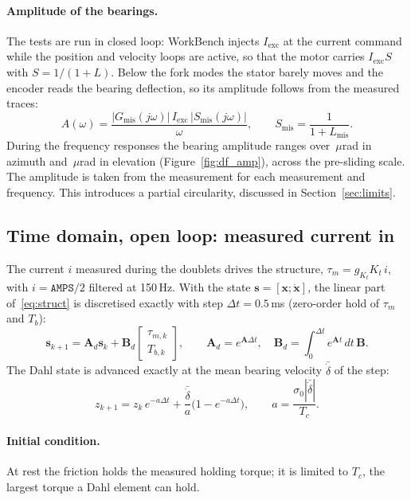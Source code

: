 \documentclass[10pt,a4paper]{article}
\numberwithin{equation}{section}
\begin{document}
\paragraph{Amplitude of the bearings.} The tests are run in closed loop: WorkBench injects $I_\mathrm{exc}$ at the current command while the position and velocity loops are active, so that the motor carries $I_\mathrm{exc}S$ with $S=1/(1+L)$. Below the fork modes the stator barely moves and the encoder reads the bearing deflection, so its amplitude follows from the measured traces:
\begin{equation}
A(\omega)=\frac{|G_\mathrm{mis}(j\omega)|\,I_\mathrm{exc}\,|S_\mathrm{mis}(j\omega)|}{\omega},\qquad S_\mathrm{mis}=\frac{1}{1+L_\mathrm{mis}} .\label{eq:amp}
\end{equation}
During the frequency responses the bearing amplitude ranges over \ArangeA\,$\mu$rad in azimuth and \ArangeP\,$\mu$rad in elevation (Figure~\ref{fig:df_amp}), across the pre-sliding scale. The amplitude is taken from the measurement for each measurement and frequency. This introduces a partial circularity, discussed in Section~\ref{sec:limits}.

\subsection{Time domain, open loop: measured current in}\label{sec:ol}
The current $i$ measured during the doublets drives the structure, $\tau_m=g_{K_t}K_t\,i$, with $i=\texttt{AMPS}/2$ filtered at 150\,Hz. With the state $\mathbf s=[\mathbf x;\dot{\mathbf x}]$, the linear part of~\eqref{eq:struct} is discretised exactly with step $\Delta t=0.5$\,ms (zero-order hold of $\tau_m$ and $T_b$):
\begin{equation}
\mathbf s_{k+1}=\mathbf A_d\mathbf s_k+\mathbf B_d\begin{bmatrix}\tau_{m,k}\\ T_{b,k}\end{bmatrix},\qquad \mathbf A_d=e^{\mathbf A\Delta t},\quad \mathbf B_d=\int_0^{\Delta t}e^{\mathbf A t}\,dt\,\mathbf B .
\end{equation}
The Dahl state is advanced exactly at the mean bearing velocity $\bar{\dot\delta}$ of the step:
\begin{equation}
z_{k+1}=z_k\,e^{-a\Delta t}+\frac{\bar{\dot\delta}}{a}\bigl(1-e^{-a\Delta t}\bigr),\qquad a=\frac{\sigma_0|\bar{\dot\delta}|}{T_c} .\label{eq:zupdate}
\end{equation}
\paragraph{Initial condition.} At rest the friction holds the measured holding torque; it is limited to $T_c$, the largest torque a Dahl element can hold.
\end{document}
